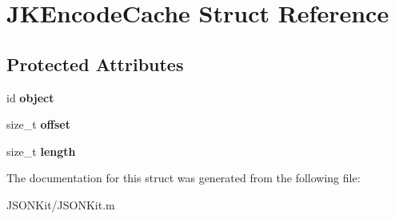 \hypertarget{struct_j_k_encode_cache}{\section{J\+K\+Encode\+Cache Struct Reference}
\label{struct_j_k_encode_cache}
}
\subsection*{Protected Attributes}
\begin{DoxyCompactItemize}
\item 
\hypertarget{struct_j_k_encode_cache_a92d31ee910f818f9d319db5f6e1a17f0}{id {\bfseries object}}\label{struct_j_k_encode_cache_a92d31ee910f818f9d319db5f6e1a17f0}

\item 
\hypertarget{struct_j_k_encode_cache_a7651dd8a8d77c384a286f0a6432a6a30}{size\+\_\+t {\bfseries offset}}\label{struct_j_k_encode_cache_a7651dd8a8d77c384a286f0a6432a6a30}

\item 
\hypertarget{struct_j_k_encode_cache_a8d75c9aafedd78bd41f58a7cae621a5a}{size\+\_\+t {\bfseries length}}\label{struct_j_k_encode_cache_a8d75c9aafedd78bd41f58a7cae621a5a}

\end{DoxyCompactItemize}


The documentation for this struct was generated from the following file\+:\begin{DoxyCompactItemize}
\item 
J\+S\+O\+N\+Kit/J\+S\+O\+N\+Kit.\+m\end{DoxyCompactItemize}

